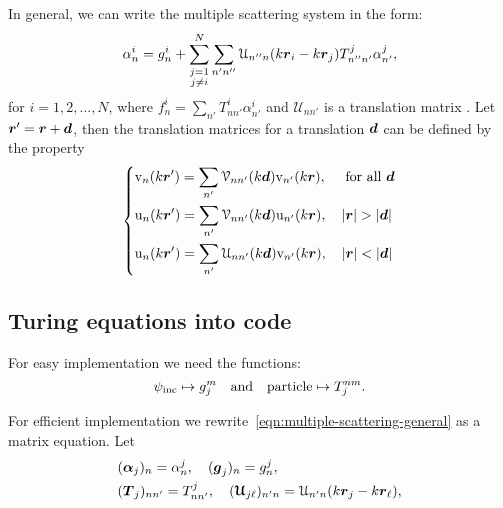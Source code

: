 \documentclass[ 12pt, a4paper]{article}
\renewcommand{\vec}[1]{\boldsymbol{#1}}
\begin{document}
In general, we can write the multiple scattering system in the form:
\begin{equation}\label{eqn:multiple-scattering-general}
   \alpha_n^i=g_{n}^i
    +\sum_{\substack{j=1\\j\neq i}}^N \sum_{n' n''}\mathcal{U}_{n''n}(k\rv_i - k\rv_j)T_{n''n'}^j \alpha_{n'}^j,
\end{equation}
for $i=1,2,\ldots,N$, where $f_n^i = \sum_{n'} T^i_{nn'}\alpha_{n'}^i$ and $\mathcal{U}_{nn'}$ is a translation matrix \cite{Bostrom+Kristensson+Strom1991,Friedman+Russek1954}. Let $\rv'=\rv+\dv$, then
the translation matrices for a translation $\dv$ can be defined by the property~\cite{Bostrom+Kristensson+Strom1991}
  \begin{equation}\label{eq:translation_spherical_waves}
 \left\{\begin{aligned}
   &\mathrm{v}_n(k\rv')=\sum_{n'}\mathcal{V}_{nn'}(k\dv)\mathrm{v}_{n'}(k\rv),\quad \text{ for all }\dv
   \\
 &\mathrm{u}_n(k\rv')=\sum_{n'}\mathcal{V}_{nn'}(k\dv)\mathrm{u}_{n'}(k\rv),\quad |\rv|>|\dv|
 \\
   &\mathrm{u}_n(k\rv')=\sum_{n'}\mathcal{U}_{nn'}(k\dv)\mathrm{v}_{n'}(k\rv),\quad |\rv|<|\dv|
   \\
 \end{aligned}\right.
 \end{equation}

\subsection{Turing equations into code}
For easy implementation we need the functions:
\[
\psi_{\mathrm{inc}} \mapsto g^m_j \quad \text{and} \quad \text{particle} \mapsto T^{nm}_j.
\]

For efficient implementation we rewrite~\eqref{eqn:multiple-scattering-general} as a matrix equation. Let
\begin{align}
  &(\vec \alpha_j)_n =  \alpha_n^j, \quad (\vec g_j)_n =  g_n^j,
  \\
  &(\vec T_j)_{nn'} = T_{nn'}^j, \quad (\vec {\mathcal U}_{j \ell})_{n'n} = \mathcal U_{n'n}(k \rv_j - k\rv_\ell),
\end{align}
\end{document}
